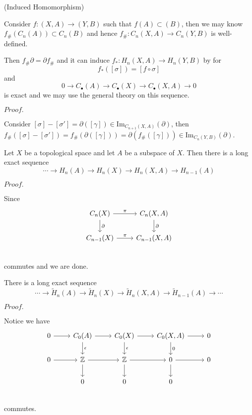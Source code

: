 \documentclass{article}
\newcommand{\Pf}[1]{$Proof.$\par}
\begin{document}
\begin{definition}(Induced Homomorphism)\par
    Consider $f:(X,A) \to (Y,B)$ such that $f(A)\subset (B)$, then we may know $f_{\#}(C_n(A)) \subset C_n(B)$ and hence $f_{\#}:C_n(X,A) \to C_n(Y,B)$ is well-defined.\par
    Then $f_{\#}\partial = \partial f_{\#}$ and it can induce $f_*: H_n(X,A) \to H_n(Y,B)$ by for
    \[f_*([\sigma]) = [f\circ \sigma]\]
    and
    \[0 \to C_{\bullet}(A) \to C_{\bullet}(X) \to C_{\bullet}(X,A) \to 0\]
    is exact and we may use the general theory on this sequence.
\end{definition}
\Pf\par
    Consider $[\sigma] - [\sigma'] = \partial([\gamma]) \in \text{Im}_{C_{n+1}(X,A)}(\partial)$, then $f_{\#}([\sigma] - [\sigma']) = f_{\#}(\partial([\gamma])) = \partial(f_{\#}([\gamma])) \in \text{Im}_{C_{n}(Y,B)}(\partial)$.

\begin{theorem}
    Let $X$ be a topological space and let $A$ be a subspace of $X$. Then there is a long exact sequence
    \[
    \cdots \to H_n(A) \to H_n(X) \to H_n(X,A) \to H_{n-1}(A)
    \]
\end{theorem}
\Pf\par
    Since
    \[
    \begin{tikzcd}
        C_n(X)\arrow[d,"\partial"]\arrow[r,"\pi"] & C_{n}(X,A)\arrow[d,"\partial"] \\
        C_{n-1}(X)\arrow[r,"\pi"] & C_{n-1}(X,A) \\
    \end{tikzcd}
    \]
    commutes and we are done.

\begin{corollary}
    There is a long exact sequence
    \[
    \cdots \to \widetilde{H}_n(A) \to \widetilde{H}_n(X) \to \widetilde{H}_n(X,A) \to \widetilde{H}_{n-1}(A) \to \cdots
    \]
\end{corollary}
\Pf\par
Notice we have
\[
\begin{tikzcd}
    0\arrow[r] & C_0(A)\arrow[r]\arrow[d,"\epsilon"] & C_0(X)\arrow[r]\arrow[d,"\epsilon"] & C_0(X,A)\arrow[r]\arrow[d,"0"] & 0 \\
    0\arrow[r] & \mathbb{Z}\arrow[r]\arrow[d] & \mathbb{Z} \arrow[r]\arrow[d] & 0\arrow[r]\arrow[d] & 0 \\
    & 0 & 0 & 0 & \\
\end{tikzcd}
\]
commutes.
\end{document}
